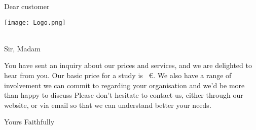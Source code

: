 \documentclass[12pt]{lettre}
\begin{document}
\begin{letter}{Dear customer}
\address{Architecture \& Design\\3, La Ville Haussan\\22100 Dinan}
\nofax

\hspace*{-1cm}\texttt{[image: Logo.png]}
 \\
 \\

\def\concname{Objet :~} %
\opening{Sir, Madam}

You have sent an inquiry about our prices and services, and we are delighted to hear from you.
Our basic price for a study is ~\euro.
We also have a range of involvement we can commit to regarding your organisation and we'd be more than happy to discuss
Please don't hesitate to contact us, either through our website, or via email so that we can understand better your needs.
\closing{Yours Faithfully}

\end{letter}
\end{document}
